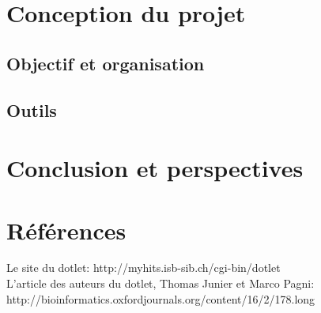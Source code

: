 \documentclass{report}
\begin{document}
\chapter{Conception du projet}

\section{Objectif et organisation}

\section{Outils}



\chapter*{Conclusion et perspectives}


\chapter*{Références}
Le site du dotlet: http://myhits.isb-sib.ch/cgi-bin/dotlet\\
L'article des auteurs du dotlet, Thomas Junier et Marco Pagni: http://bioinformatics.oxfordjournals.org/content/16/2/178.long\\
\end{document}
